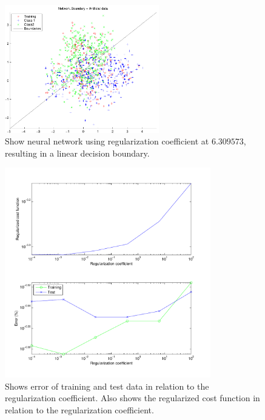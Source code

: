 \begin{figure}[!htbp]
  \centering
  \includegraphics[width=0.6\textwidth]{./images/q210b_reg5}
  \caption{Show neural network using regularization coefficient at $6.309573$, resulting in
    a linear decision boundary.}
  \label{fig:q210breg5}
\end{figure}

\begin{figure}[!htbp]
  \centering
  \includegraphics[width=0.8\textwidth]{./images/q210b_error}
  \caption{Shows error of training and test data in relation to the
    regularization coefficient. Also shows the regularized cost function
    in relation to the regularization coefficient.}
  \label{fig:q210berror}
\end{figure}

